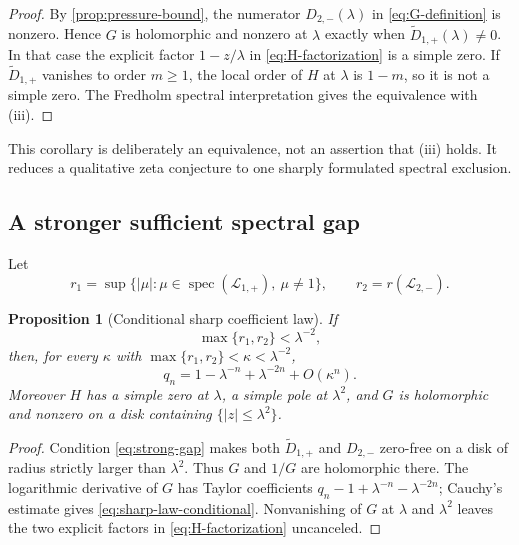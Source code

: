 \documentclass[11pt]{article}
\newtheorem{proposition}[theorem]{Proposition}
\theoremstyle{definition}
\theoremstyle{remark}
\newcommand{\spec}{\operatorname{spec}}
\newcommand{\cL}{\mathcal L}
\begin{document}
\begin{proof}
By \cref{prop:pressure-bound}, the numerator $D_{2,-}(\lambda)$ in
\eqref{eq:G-definition} is nonzero.  Hence $G$ is holomorphic and nonzero at
$\lambda$ exactly when $\widetilde D_{1,+}(\lambda)\ne0$.  In that case the
explicit factor $1-z/\lambda$ in \eqref{eq:H-factorization} is a simple zero.
If $\widetilde D_{1,+}$ vanishes to order $m\ge1$, the local order of $H$ at
$\lambda$ is $1-m$, so it is not a simple zero.  The Fredholm spectral
interpretation gives the equivalence with (iii).
\end{proof}

This corollary is deliberately an equivalence, not an assertion that (iii)
holds.  It reduces a qualitative zeta conjecture to one sharply formulated
spectral exclusion.

\subsection{A stronger sufficient spectral gap}

Let
\begin{equation}\label{eq:reduced-radii}
 r_1=\sup\{|\mu|:\mu\in\spec(\cL_{1,+}),\ \mu\ne1\},
 \qquad
 r_2=r(\cL_{2,-}).
\end{equation}

\begin{proposition}[Conditional sharp coefficient law]
\label{prop:conditional-sharp}
If
\begin{equation}\label{eq:strong-gap}
 \max\{r_1,r_2\}<\lambda^{-2},
\end{equation}
then, for every $\kappa$ with
$\max\{r_1,r_2\}<\kappa<\lambda^{-2}$,
\begin{equation}\label{eq:sharp-law-conditional}
 q_n=1-\lambda^{-n}+\lambda^{-2n}+O(\kappa^n).
\end{equation}
Moreover $H$ has a simple zero at $\lambda$, a simple pole at $\lambda^2$,
and $G$ is holomorphic and nonzero on a disk containing
$\{|z|\le\lambda^2\}$.
\end{proposition}

\begin{proof}
Condition \eqref{eq:strong-gap} makes both
$\widetilde D_{1,+}$ and $D_{2,-}$ zero-free on a disk of radius strictly
larger than $\lambda^2$.  Thus $G$ and $1/G$ are holomorphic there.  The
logarithmic derivative of $G$ has Taylor coefficients
$q_n-1+\lambda^{-n}-\lambda^{-2n}$; Cauchy's estimate gives
\eqref{eq:sharp-law-conditional}.  Nonvanishing of $G$ at $\lambda$ and
$\lambda^2$ leaves the two explicit factors in \eqref{eq:H-factorization}
uncanceled.
\end{proof}
\end{document}
